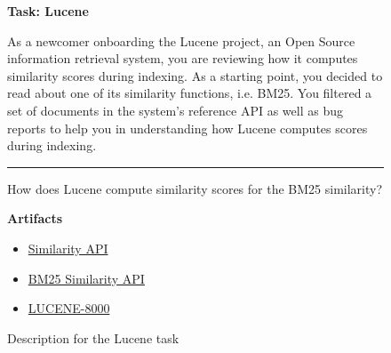 \begin{figure}
\begin{mdframed}[backgroundcolor=gray!05] 
\begin{scriptsize}

{\large \textbf{Task: Lucene}} \bigskip

As a newcomer onboarding the Lucene project, an Open Source information retrieval system,
you are reviewing how it computes similarity scores during indexing. As a starting point, you
decided to read about one of its similarity functions, i.e. BM25. You filtered a set of documents
in the system's reference API as well as bug reports to help you in understanding how Lucene
computes scores during indexing.

\begin{center}
\rule{10cm}{0.4pt}
\end{center}

How does Lucene compute similarity scores for the BM25 similarity?

\medskip

\textbf{Artifacts}

\begin{itemize}
    \item \href{https://lucene.apache.org/core/7_1_0/core/org/apache/lucene/search/similarities/Similarity.html}{Similarity API}
    \item \href{https://lucene.apache.org/core/7_1_0/core/org/apache/lucene/search/similarities/BM25Similarity.html}{BM25 Similarity API}
    \item \href{https://issues.apache.org/jira/si/jira.issueviews:issue-html/LUCENE-8000/LUCENE-8000.html}{LUCENE-8000}
\end{itemize}

\end{scriptsize}
\end{mdframed}
\caption{Description for the Lucene task}
\end{figure}

    
